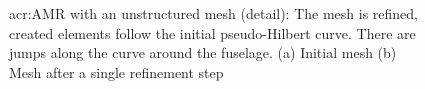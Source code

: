 \begin{figure}[H]
	\centering
	\caption{\Acrlong{acr:AMR} with an unstructured mesh (detail): The mesh is refined, created elements follow the initial pseudo-Hilbert curve. There are jumps along the curve around the fuselage. (a) Initial mesh (b) Mesh after a single refinement step}\label{fig:mesh_P0_adaptivity_near}
\end{figure}

